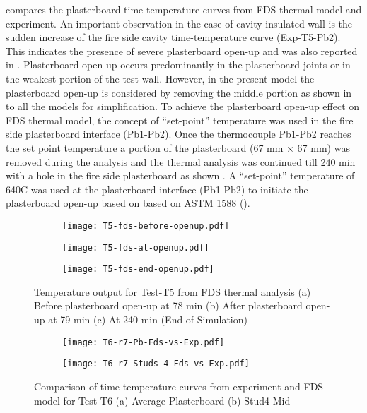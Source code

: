  compares the plasterboard time-temperature curves from FDS thermal model and experiment. An important observation in the case of cavity insulated wall is the sudden increase of the fire side cavity time-temperature curve (Exp-T5-Pb2). This indicates the presence of severe plasterboard open-up and was also reported in . Plasterboard open-up occurs predominantly in the plasterboard joints or in the weakest portion of the test wall. However, in the present model the plasterboard open-up is considered by removing the middle portion as shown in  to all the models for simplification. To achieve the plasterboard open-up effect on FDS thermal model, the concept of ``set-point'' temperature was used in the fire side plasterboard interface (Pb1-Pb2). Once the thermocouple Pb1-Pb2 reaches the set point temperature a portion of the plasterboard (67 mm $\times$ 67 mm) was removed during the analysis and the thermal analysis was continued till 240 min with a hole in the fire side plasterboard as shown . A ``set-point'' temperature of 640\degree C was used at the plasterboard interface (Pb1-Pb2) to initiate the plasterboard open-up based on based on ASTM 1588 (\citet{Sultan2015}). 
\begin{figure}[!htbp]
	\centering
	\begin{subfigure}[b]{0.45\textwidth}
		\centering
		\texttt{[image: T5-fds-before-openup.pdf]}
		\caption{}
		\label{subfig:T5-fds-before-openup}
	\end{subfigure}
	\begin{subfigure}[b]{0.45\textwidth}
		\centering
		\texttt{[image: T5-fds-at-openup.pdf]}
		\caption{}
		\label{subfig:T5-fds-at-openup}
	\end{subfigure}
	\begin{subfigure}[b]{0.45\textwidth}
		\centering
		\texttt{[image: T5-fds-end-openup.pdf]}
		\caption{}
		\label{subfig:T5-fds-end-openup}
	\end{subfigure}
	   \caption{Temperature output for Test-T5 from FDS thermal analysis (a) Before plasterboard open-up at 78 min (b) After plasterboard open-up at 79 min (c) At 240 min (End of Simulation)}
	   \label{fig:T5-fds-output}
\end{figure}
\begin{figure}[!htbp]
	\centering
	\begin{subfigure}[b]{0.7\textwidth}
		\centering
		\texttt{[image: T6-r7-Pb-Fds-vs-Exp.pdf]}
		\caption{}
		\label{subfig:T6-r7-Pb-Fds-vs-Exp}
	\end{subfigure}
	\begin{subfigure}[b]{0.6\textwidth}
		\centering
		\texttt{[image: T6-r7-Studs-4-Fds-vs-Exp.pdf]}
		\caption{}
		\label{subfig:T6-r7-Studs-4-Fds-vs-Exp}
	\end{subfigure}
	   \caption{Comparison of time-temperature curves from experiment and FDS model for Test-T6 (a) Average Plasterboard (b) Stud4-Mid}
	   \label{fig:fds-output-pb-studs-t6}
\end{figure}

